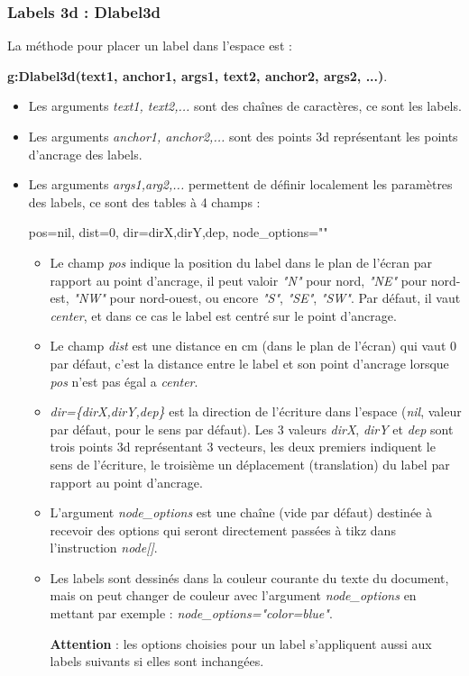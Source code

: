 \subsubsection{Labels 3d : Dlabel3d}

La méthode pour placer un label dans l'espace est :

\hfil\textbf{g:Dlabel3d(text1, anchor1, args1, text2, anchor2, args2, ...)}.\hfil

    \begin{itemize}
    \item  Les arguments \emph{text1, text2,...} sont des chaînes de caractères, ce sont les labels.
    \item  Les arguments \emph{anchor1, anchor2,...} sont des points 3d représentant les points d'ancrage des labels.
    \item  Les arguments \emph{args1,arg2,...}  permettent de définir localement les paramètres des labels, ce sont des tables à 4 champs :
\begin{TeXcode}
    { pos=nil, dist=0, dir={dirX,dirY,dep}, node_options="" }
\end{TeXcode}
        \begin{itemize}
            \item Le champ \emph{pos} indique la position du label dans le plan de l'écran par rapport au point d'ancrage, il peut valoir \emph{"N"} pour nord, \emph{"NE"} pour nord-est, \emph{"NW"} pour nord-ouest, ou encore \emph{"S"}, \emph{"SE"}, \emph{"SW"}. Par défaut, il vaut \emph{center}, et dans ce cas le label est centré sur le point  d'ancrage.
            \item Le champ \emph{dist} est une distance en cm (dans le plan de l'écran) qui vaut $0$ par défaut, c'est la distance entre le label et son point d'ancrage lorsque \emph{pos} n'est pas égal a \emph{center}.
            \item \emph{dir=\{dirX,dirY,dep\}} est la direction de l'écriture dans l'espace (\emph{nil}, valeur par défaut, pour le sens par défaut). Les 3 valeurs \emph{dirX}, \emph{dirY} et \emph{dep} sont trois points 3d représentant 3 vecteurs, les deux premiers indiquent le sens de l'écriture, le troisième un déplacement (translation) du label par rapport au point d'ancrage.
            \item L'argument \emph{node\_options} est une chaîne (vide par défaut) destinée à recevoir des options qui seront directement passées à tikz dans l'instruction \emph{node{[}{]}}.
            \item Les labels sont dessinés dans la couleur courante du texte du document, mais on peut changer de couleur avec l'argument \emph{node\_options} en mettant par exemple : \emph{node\_options="color=blue"}.
            
            \textbf{Attention} : les options choisies pour un label s'appliquent aussi aux labels suivants si elles sont inchangées.
        \end{itemize}
  \end{itemize}

